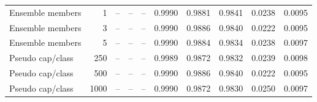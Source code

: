 \begin{tabular}{lrrrrrrrrr}
Ensemble members & 1 & -- & -- & -- & 0.9990 & 0.9881 & 0.9841 & 0.0238 & 0.0095 \\
Ensemble members & 3 & -- & -- & -- & 0.9990 & 0.9886 & 0.9840 & 0.0222 & 0.0095 \\
Ensemble members & 5 & -- & -- & -- & 0.9990 & 0.9884 & 0.9834 & 0.0238 & 0.0097 \\
Pseudo cap/class & 250 & -- & -- & -- & 0.9989 & 0.9872 & 0.9832 & 0.0239 & 0.0098 \\
Pseudo cap/class & 500 & -- & -- & -- & 0.9990 & 0.9886 & 0.9840 & 0.0222 & 0.0095 \\
Pseudo cap/class & 1000 & -- & -- & -- & 0.9990 & 0.9872 & 0.9830 & 0.0250 & 0.0097 \\
\bottomrule
\end{tabular}
